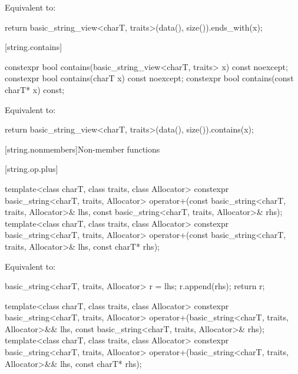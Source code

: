 \begin{itemdescr}
\pnum
\effects
Equivalent to:
\begin{codeblock}
return basic_string_view<charT, traits>(data(), size()).ends_with(x);
\end{codeblock}
\end{itemdescr}

[string.contains]{}

%
\begin{itemdecl}
constexpr bool contains(basic_string_view<charT, traits> x) const noexcept;
constexpr bool contains(charT x) const noexcept;
constexpr bool contains(const charT* x) const;
\end{itemdecl}

\begin{itemdescr}
\pnum
\effects
Equivalent to:
\begin{codeblock}
return basic_string_view<charT, traits>(data(), size()).contains(x);
\end{codeblock}
\end{itemdescr}

[string.nonmembers]{Non-member functions}


[string.op.plus]{}

%
\begin{itemdecl}
template<class charT, class traits, class Allocator>
  constexpr basic_string<charT, traits, Allocator>
    operator+(const basic_string<charT, traits, Allocator>& lhs,
              const basic_string<charT, traits, Allocator>& rhs);
template<class charT, class traits, class Allocator>
  constexpr basic_string<charT, traits, Allocator>
    operator+(const basic_string<charT, traits, Allocator>& lhs, const charT* rhs);
\end{itemdecl}

\begin{itemdescr}
\pnum
\effects
Equivalent to:
\begin{codeblock}
basic_string<charT, traits, Allocator> r = lhs;
r.append(rhs);
return r;
\end{codeblock}
\end{itemdescr}

%
\begin{itemdecl}
template<class charT, class traits, class Allocator>
  constexpr basic_string<charT, traits, Allocator>
    operator+(basic_string<charT, traits, Allocator>&& lhs,
              const basic_string<charT, traits, Allocator>& rhs);
template<class charT, class traits, class Allocator>
  constexpr basic_string<charT, traits, Allocator>
    operator+(basic_string<charT, traits, Allocator>&& lhs, const charT* rhs);
\end{itemdecl}

